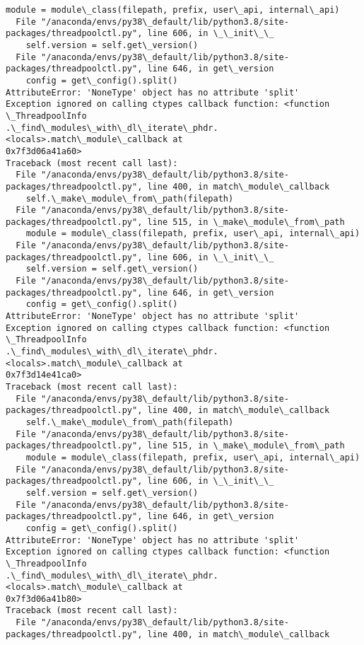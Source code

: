 \documentclass[11pt]{article}
\begin{document}
\begin{Verbatim}[commandchars=\\\{\}]
    module = module\_class(filepath, prefix, user\_api, internal\_api)
  File "/anaconda/envs/py38\_default/lib/python3.8/site-
packages/threadpoolctl.py", line 606, in \_\_init\_\_
    self.version = self.get\_version()
  File "/anaconda/envs/py38\_default/lib/python3.8/site-
packages/threadpoolctl.py", line 646, in get\_version
    config = get\_config().split()
AttributeError: 'NoneType' object has no attribute 'split'
Exception ignored on calling ctypes callback function: <function \_ThreadpoolInfo
.\_find\_modules\_with\_dl\_iterate\_phdr.<locals>.match\_module\_callback at
0x7f3d06a41a60>
Traceback (most recent call last):
  File "/anaconda/envs/py38\_default/lib/python3.8/site-
packages/threadpoolctl.py", line 400, in match\_module\_callback
    self.\_make\_module\_from\_path(filepath)
  File "/anaconda/envs/py38\_default/lib/python3.8/site-
packages/threadpoolctl.py", line 515, in \_make\_module\_from\_path
    module = module\_class(filepath, prefix, user\_api, internal\_api)
  File "/anaconda/envs/py38\_default/lib/python3.8/site-
packages/threadpoolctl.py", line 606, in \_\_init\_\_
    self.version = self.get\_version()
  File "/anaconda/envs/py38\_default/lib/python3.8/site-
packages/threadpoolctl.py", line 646, in get\_version
    config = get\_config().split()
AttributeError: 'NoneType' object has no attribute 'split'
Exception ignored on calling ctypes callback function: <function \_ThreadpoolInfo
.\_find\_modules\_with\_dl\_iterate\_phdr.<locals>.match\_module\_callback at
0x7f3d14e41ca0>
Traceback (most recent call last):
  File "/anaconda/envs/py38\_default/lib/python3.8/site-
packages/threadpoolctl.py", line 400, in match\_module\_callback
    self.\_make\_module\_from\_path(filepath)
  File "/anaconda/envs/py38\_default/lib/python3.8/site-
packages/threadpoolctl.py", line 515, in \_make\_module\_from\_path
    module = module\_class(filepath, prefix, user\_api, internal\_api)
  File "/anaconda/envs/py38\_default/lib/python3.8/site-
packages/threadpoolctl.py", line 606, in \_\_init\_\_
    self.version = self.get\_version()
  File "/anaconda/envs/py38\_default/lib/python3.8/site-
packages/threadpoolctl.py", line 646, in get\_version
    config = get\_config().split()
AttributeError: 'NoneType' object has no attribute 'split'
Exception ignored on calling ctypes callback function: <function \_ThreadpoolInfo
.\_find\_modules\_with\_dl\_iterate\_phdr.<locals>.match\_module\_callback at
0x7f3d06a41b80>
Traceback (most recent call last):
  File "/anaconda/envs/py38\_default/lib/python3.8/site-
packages/threadpoolctl.py", line 400, in match\_module\_callback

\end{Verbatim}
\end{document}
